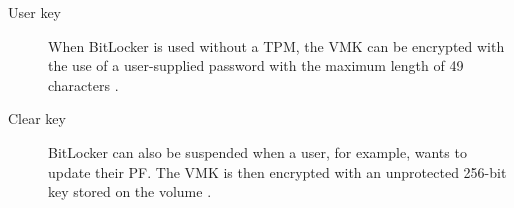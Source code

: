 \begin{description}
    \item[User key] When BitLocker is used without a \ac{TPM}, the \ac{VMK} can be encrypted with the use of a user-supplied password with the maximum length of 49 characters \cite[Section 2.7]{bde-format-spec}.

    \item[Clear key] BitLocker can also be suspended when a user, for example, wants to update their \ac{PF}.
        The \ac{VMK} is then encrypted with an unprotected 256-bit key stored on the volume \cite[Section 2.5]{bde-format-spec}.

\end{description}